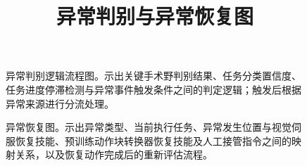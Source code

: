 \documentclass[11pt,a4paper]{article}
\title{异常判别与异常恢复图}
\author{}
\date{}
\begin{document}
\maketitle

\begin{figure}[htbp]
  \centering
  
  \caption{异常判别逻辑流程图。示出关键手术野判别结果、任务分类置信度、任务进度停滞检测与异常事件触发条件之间的判定逻辑；触发后根据异常来源进行分流处理。}
  \label{fig:anomaly-logic}
\end{figure}

\begin{figure}[htbp]
  \centering
  
  \caption{异常恢复图。示出异常类型、当前执行任务、异常发生位置与视觉伺服恢复技能、预训练动作块转换器恢复技能及人工接管指令之间的映射关系，以及恢复动作完成后的重新评估流程。}
  \label{fig:anomaly-recovery}
\end{figure}
\end{document}
